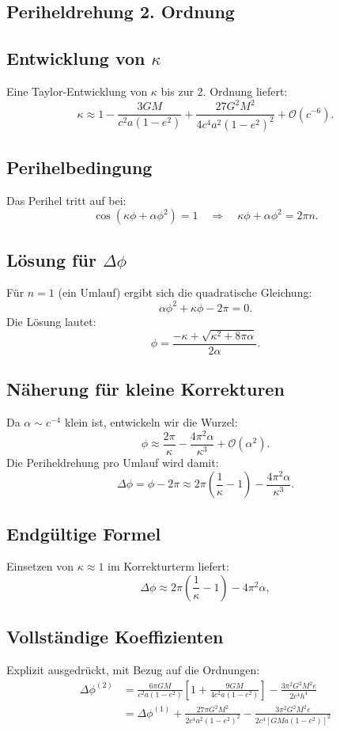 \subsection{Periheldrehung 2. Ordnung}
\subsection*{Entwicklung von $\kappa$}
Eine Taylor-Entwicklung von $\kappa$ bis zur 2. Ordnung liefert:
\[
    \kappa \approx 1 - \frac{3GM}{c^2 a(1 - e^2)} + \frac{27G^2 M^2}{4c^4 a^2 (1 - e^2)^2} + \mathcal{O}(c^{-6}).
\]

\subsection*{Perihelbedingung}
Das Perihel tritt auf bei:
\[
    \cos\left(\kappa\phi + \alpha\phi^2\right) = 1 \quad \Rightarrow \quad \kappa\phi + \alpha\phi^2 = 2\pi n.
\]

\subsection*{Lösung für $\Delta\phi$}
Für $n=1$ (ein Umlauf) ergibt sich die quadratische Gleichung:
\[
\alpha\phi^2 + \kappa\phi - 2\pi = 0.
\]
Die Lösung lautet:
\begin{equation}
\phi = \frac{-\kappa + \sqrt{\kappa^2 + 8\pi\alpha}}{2\alpha}.
\end{equation}

\subsection*{Näherung für kleine Korrekturen}
Da $\alpha \sim c^{-4}$ klein ist, entwickeln wir die Wurzel:
\[
    \phi \approx \frac{2\pi}{\kappa} - \frac{4\pi^2\alpha}{\kappa^3} + \mathcal{O}(\alpha^2).
\]
Die Periheldrehung pro Umlauf wird damit:
\begin{equation}
\Delta\phi = \phi - 2\pi \approx 2\pi\left(\frac{1}{\kappa} - 1\right) - \frac{4\pi^2\alpha}{\kappa^3}.    
\end{equation}

\subsection*{Endgültige Formel}
Einsetzen von $\kappa \approx 1$ im Korrekturterm liefert:
\begin{equation}
\boxed
{
    \Delta\phi \approx 2\pi\left(\frac{1}{\kappa} - 1\right) - 4\pi^2\alpha
},
\end{equation}

\subsection*{Vollständige Koeffizienten}
Explizit ausgedrückt, mit Bezug auf die Ordnungen:
\begin{align*}
\Delta\phi^{(2)} &= \frac{6\pi GM}{c^2 a(1 - e^2)} \left[1 + \frac{9GM}{4c^2 a(1 - e^2)}\right] - \frac{3\pi^2 G^2 M^2 e}{2c^4 h^4} \\
&= \Delta\phi^{(1)} + \frac{27\pi G^2 M^2}{2c^4 a^2 (1 - e^2)^2} - \frac{3\pi^2 G^2 M^2 e}{2c^4 [GMa(1 - e^2)]^2}
\end{align*}
